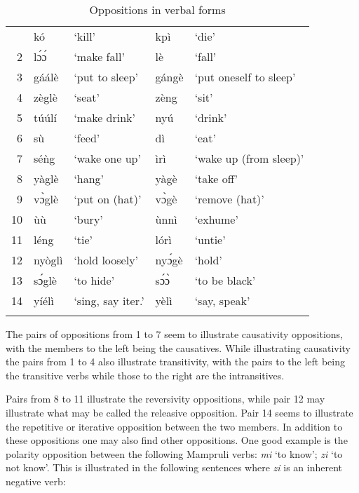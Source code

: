 \begin{table}
    \begin{tabularx}{\textwidth}{r@{\qquad}lXll}
    \lsptoprule
1 &kó &‘kill’ &kpì &‘die’\\
2 &lɔ́ɔ́& ‘make fall’& lè& ‘fall’\\
3 &gáálè& ‘put to sleep’& gángè &‘put oneself to sleep’\\
4 &zèglè &‘seat’& zèng &‘sit’\\
5& túúlí& ‘make drink’ &nyú &‘drink’\\
6 &sù &‘feed’ &dì & ‘eat’\\
7& séǹg& ‘wake one up’ &ìrì &‘wake up (from sleep)’\\
8& yàglè& ‘hang’& yàgè& ‘take off’\\
9 &vɔ̀glè &‘put on (hat)’ &vɔ̀gè &‘remove (hat)’\\
10 &ùù &‘bury’ &ùnnì &‘exhume’\\
11 &léng &‘tie’ &lórì &‘untie’\\
12 &nyòglì &‘hold loosely’ &nyɔ́gè &‘hold’\\
13& sɔ́glè &‘to hide’ &sɔ́ɔ̀ &‘to be black’\\
14 &yíélì& ‘sing, say iter.' &yèlì& ‘say, speak’\\
\lspbottomrule
    \end{tabularx}
    \caption{Oppositions in verbal forms}
    \label{tab:verbOppositions}
\end{table}

The pairs of oppositions from 1 to 7 seem to illustrate causativity oppositions, with the
members to the left being the causatives.
While illustrating causativity the pairs from 1 to 4 also illustrate transitivity, with the
pairs to the left being the transitive verbs while those to the right are the intransitives.

Pairs from 8 to 11 illustrate the reversivity oppositions, while pair 12 may
illustrate what may be called the releasive opposition. Pair 14 seems to illustrate the repetitive
or iterative opposition between the two members.
In addition to these oppositions one may also find other oppositions. One good
example is the polarity opposition between the following Mampruli verbs: \textit{mi} ‘to know’; \textit{zi}
‘to not know’. This is illustrated in the following sentences where \textit{zi} is an inherent negative
verb:

\ea {}
\z\z



